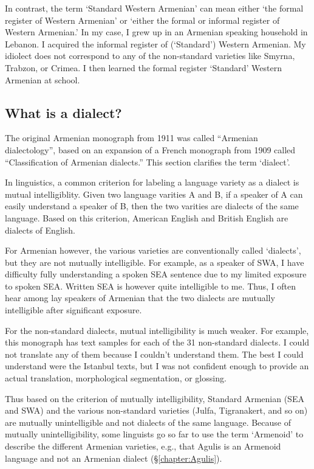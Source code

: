 In contrast, the term `Standard Western Armenian' can mean either `the formal register of Western Armenian' or `either the formal or informal register of Western Armenian.' In my case, I grew up in an Armenian speaking household in Lebanon. I acquired the informal register of (`Standard') Western Armenian. My idiolect does not correspond to any of the non-standard varieties like Smyrna, Trabzon, or Crimea. I then learned the formal register `Standard' Western Armenian at school. 









\subsection{What is a dialect?}\label{sec:HossepIntro:armenian:whatisdialect}

The original Armenian monograph from 1911 was called ``Armenian dialectology'', based on an expansion of a French monograph from 1909 called ``Classification of Armenian dialects.'' This section clarifies the term `dialect'. 

In linguistics, a common criterion for labeling a language variety as a dialect is mutual intelligiblity. Given two language varities A and B, if a speaker of A can easily understand a speaker of B, then the two varities are dialects of the same language. Based on this criterion, American English and British English are dialects of English. 

For Armenian however, the various varieties are conventionally called `dialects', but they are not mutually intelligible. For example, as a speaker of SWA, I have difficulty fully understanding a spoken SEA sentence due to my limited exposure to spoken SEA. Written SEA is however quite intelligible to me. Thus, I often hear among lay speakers of Armenian that the two dialects are mutually intelligible after significant exposure. 

For the non-standard dialects, mutual intelligibility is much weaker. For example, this monograph has text samples for each of the 31 non-standard dialects. I could not translate any of them because I couldn't understand them. The best I could understand were the Istanbul texts, but I was not confident enough to provide an actual translation, morphological segmentation, or glossing. 


Thus based on the criterion of mutually intelligibility, Standard Armenian (SEA and SWA) and the various non-standard varieties (Julfa, Tigranakert, and so on) are mutually unintelligible and not dialects of the same language. Because of mutually unintelligibility, some linguists go so far to use the term `Armenoid' to describe the different Armenian varieties, e.g., that Agulis is an Armenoid language \citep{Vaux-2008-ArmenianZok} and not an Armenian dialect (\S\ref{chapter:Agulis}). 

